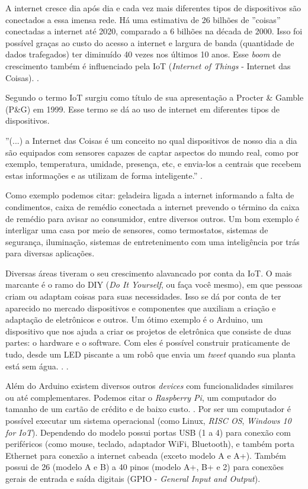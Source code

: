 \documentclass[
	12pt,				%
	openright,			%
	oneside,			%
	a4paper,			%
	chapter=TITLE,		%
	english,			%
	french,				%
	spanish,			%
	brazil				%
	]{abntex2}
\begin{document}
{A internet cresce dia após dia e cada vez mais diferentes tipos de dispositivos são conectados a essa imensa rede. Há uma estimativa de 26 bilhões de ''coisas'' conectadas a internet até 2020, comparado a 6 bilhões na década de 2000. Isso foi possível graças ao custo do acesso a internet e largura de banda (quantidade de dados trafegados) ter diminuído 40 vezes nos últimos 10 anos. Esse \textit{boom} de crescimento também é influenciado pela IoT (\textit{Internet of Things} - Internet das Coisas). \cite{goldmansachs-iot}. 

Segundo  o termo IoT surgiu como título de sua apresentação a Procter \& Gamble (P\&G) em 1999. Esse termo se dá ao uso de internet em diferentes tipos de dispositivos. 

\begin{citacao}
''(...) a Internet das Coisas é um conceito no qual dispositivos de nosso dia a dia são equipados com sensores capazes de captar aspectos do mundo real, como por exemplo, temperatura, umidade, presença, etc, e envia-los a centrais que recebem estas informações e as utilizam de forma inteligente.'' \cite{nascimento-iot}.
\end{citacao}

Como exemplo podemos citar: geladeira ligada a internet informando a falta de condimentos, caixa de remédio conectada a internet prevendo o término da caixa de remédio para avisar ao consumidor, entre diversos outros. Um bom exemplo é interligar uma casa por meio de sensores, como termostatos, sistemas de segurança, iluminação, sistemas de entretenimento com uma inteligência por trás para diversas aplicações. \cite{goldmansachs-iot}

Diversas áreas tiveram o seu crescimento alavancado por conta da IoT. O mais marcante é o ramo do DIY (\textit{Do It Yourself}, ou faça você mesmo), em que pessoas criam ou adaptam coisas para suas necessidades. Isso se dá por conta de ter aparecido no mercado dispositivos e componentes que auxiliam a criação e adaptação de eletrônicos e outros. Um ótimo exemplo é o Arduino, um dispositivo que nos ajuda a criar os projetos de eletrônica que consiste de duas partes: o hardware e o software. Com eles é possível construir praticamente de tudo, desde um LED piscante a um robô que envia um \textit{tweet} quando sua planta está sem água. \cite{ben-arduino}. \cite{sorrel-arduino}.

Além do Arduino existem diversos outros \textit{devices} com funcionalidades similares ou até complementares. Podemos citar o \textit{Raspberry Pi}, um computador do tamanho de um cartão de crédito e de baixo custo. \cite{raspberrypi-rpi}. Por ser um computador é possível executar um sistema operacional (como Linux, \textit{RISC OS}, \textit{Windows 10 for IoT}). Dependendo do modelo possui portas USB (1 a 4) para conexão com periféricos (como mouse, teclado, adaptador WiFi, Bluetooth), e também porta Ethernet para conexão a internet cabeada (exceto modelo A e A+). Também possui de 26 (modelo A e B) a 40 pinos (modelo A+, B+ e 2) para conexões gerais de entrada e saída digitais (GPIO - \textit{General Input and Output}). 

}
\end{document}
